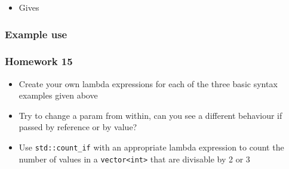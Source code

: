 \begin{itemize}
\tightlist
\item
  Gives
\end{itemize}

\begin{Shaded}
\begin{Highlighting}[]
\NormalTok{) = }
\NormalTok{) = }
\end{Highlighting}
\end{Shaded}

\hypertarget{example-use}{%
\subsubsection{Example use}\label{example-use}}

\begin{Shaded}
\end{Shaded}

\hypertarget{homework-15}{%
\subsubsection{Homework 15}\label{homework-15}}

\begin{itemize}
\tightlist
\item
  Create your own lambda expressions for each of the three basic syntax
  examples given above
\item
  Try to change a param from within, can you see a different behaviour
  if passed by reference or by value?
\item
  Use \texttt{std::count\_if} with an appropriate lambda expression to
  count the number of values in a
  \texttt{vector\textless{}int\textgreater{}} that are divisable by 2 or
  3
\end{itemize}

